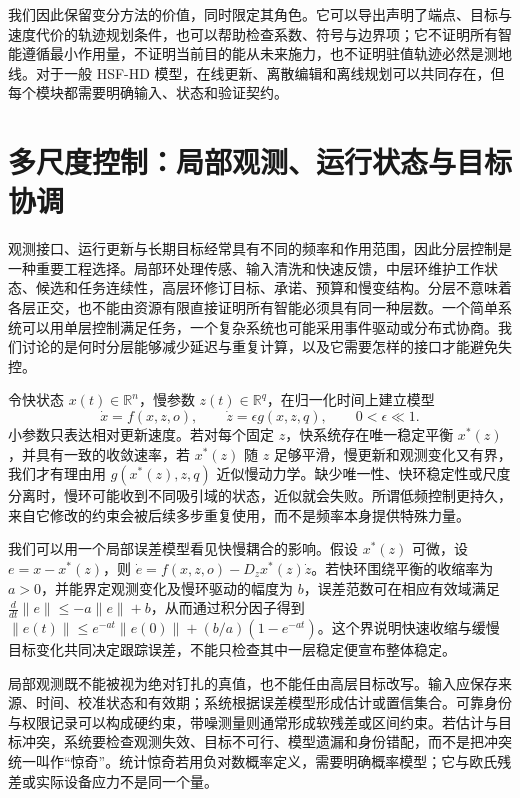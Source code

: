 我们因此保留变分方法的价值，同时限定其角色。它可以导出声明了端点、目标与速度代价的轨迹规划条件，也可以帮助检查系数、符号与边界项；它不证明所有智能遵循最小作用量，不证明当前目的能从未来施力，也不证明驻值轨迹必然是测地线。对于一般 HSF-HD 模型，在线更新、离散编辑和离线规划可以共同存在，但每个模块都需要明确输入、状态和验证契约。

\section{多尺度控制：局部观测、运行状态与目标协调}
\label{sec:section_5140}

观测接口、运行更新与长期目标经常具有不同的频率和作用范围，因此分层控制是一种重要工程选择。局部环处理传感、输入清洗和快速反馈，中层环维护工作状态、候选和任务连续性，高层环修订目标、承诺、预算和慢变结构。分层不意味着各层正交，也不能由资源有限直接证明所有智能必须具有同一种层数。一个简单系统可以用单层控制满足任务，一个复杂系统也可能采用事件驱动或分布式协商。我们讨论的是何时分层能够减少延迟与重复计算，以及它需要怎样的接口才能避免失控。

令快状态 $x(t)\in\mathbb R^n$，慢参数 $z(t)\in\mathbb R^q$，在归一化时间上建立模型
\begin{equation}
 \dot x=f(x,z,o),\qquad \dot z=\epsilon g(x,z,q),
 \qquad 0<\epsilon\ll1.
\end{equation}
小参数只表达相对更新速度。若对每个固定 $z$，快系统存在唯一稳定平衡 $x^*(z)$，并具有一致的收敛速率，若 $x^*(z)$ 随 $z$ 足够平滑，慢更新和观测变化又有界，我们才有理由用 $g(x^*(z),z,q)$ 近似慢动力学。缺少唯一性、快环稳定性或尺度分离时，慢环可能收到不同吸引域的状态，近似就会失败。所谓低频控制更持久，来自它修改的约束会被后续多步重复使用，而不是频率本身提供特殊力量。

我们可以用一个局部误差模型看见快慢耦合的影响。假设 $x^*(z)$ 可微，设 $e=x-x^*(z)$，则 $\dot e=f(x,z,o)-D_zx^*(z)\dot z$。若快环围绕平衡的收缩率为 $a>0$，并能界定观测变化及慢环驱动的幅度为 $b$，误差范数可在相应有效域满足 $\frac{d}{dt}\|e\|\le-a\|e\|+b$，从而通过积分因子得到 $\|e(t)\|\le e^{-at}\|e(0)\|+(b/a)(1-e^{-at})$。这个界说明快速收缩与缓慢目标变化共同决定跟踪误差，不能只检查其中一层稳定便宣布整体稳定。

局部观测既不能被视为绝对钉扎的真值，也不能任由高层目标改写。输入应保存来源、时间、校准状态和有效期；系统根据误差模型形成估计或置信集合。可靠身份与权限记录可以构成硬约束，带噪测量则通常形成软残差或区间约束。若估计与目标冲突，系统要检查观测失效、目标不可行、模型遗漏和身份错配，而不是把冲突统一叫作“惊奇”。统计惊奇若用负对数概率定义，需要明确概率模型；它与欧氏残差或实际设备应力不是同一个量。

